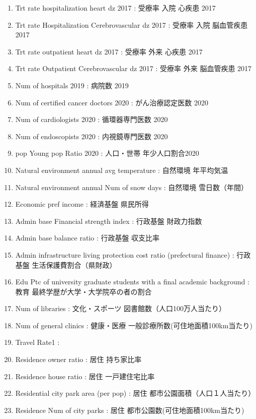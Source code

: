 \begin{enumerate}


  \item   Trt rate hospitalization heart dz 2017  : 受療率 入院 心疾患 2017
  \item   Trt rate Hospitalization Cerebrovascular dz 2017  : 受療率 入院 脳血管疾患 2017
  \item   Trt rate outpatient heart dz 2017  : 受療率 外来 心疾患 2017
  \item   Trt rate Outpatient Cerebrovascular dz 2017  : 受療率 外来 脳血管疾患 2017
  \item   Num of hospitals 2019  :   病院数 2019
  \item   Num of certified cancer doctors 2020  :   がん治療認定医数 2020
  \item   Num of cardiologists 2020  :   循環器専門医数 2020
  \item   Num of endoscopists 2020  :   内視鏡専門医数 2020
  \item   pop Young pop Ratio 2020  :   人口・世帯 年少人口割合2020
  \item   Natural environment annual avg temperature  :   自然環境 年平均気温
  \item   Natural environment annual Num of snow days  :   自然環境 雪日数（年間）
  \item   Economic pref income  :   経済基盤 県民所得
  \item   Admin base Financial strength index  :   行政基盤 財政力指数
  \item   Admin base balance ratio  :   行政基盤 収支比率
  \item   Admin infrastructure living protection cost ratio (prefectural finance)  :   行政基盤 生活保護費割合（県財政）
  \item   Edu Ptc of university graduate students with a final academic background  :   教育 最終学歴が大学・大学院卒の者の割合
  \item   Num of libraries  :   文化・スポーツ 図書館数（人口100万人当たり）
  \item   Num of general clinics  :   健康・医療 一般診療所数(可住地面積100km当たり)
  \item   Travel Rate1  :
  \item   Residence owner ratio  :   居住 持ち家比率
  \item   Residence house ratio  :   居住 一戸建住宅比率
  \item   Residential city park area (per pop)  :   居住 都市公園面積（人口１人当たり）
  \item   Residence Num of city parks  :   居住 都市公園数(可住地面積100km当たり)

\end{enumerate}
